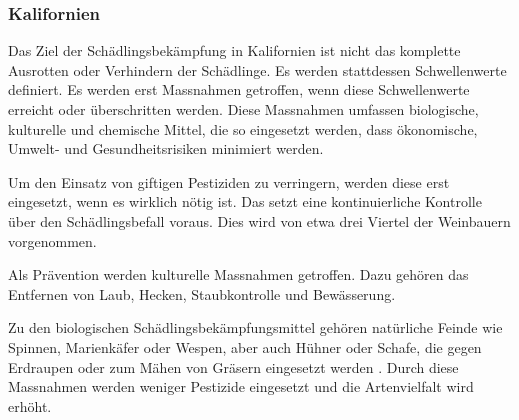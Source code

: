 \subsubsection{Kalifornien}
\label{sub:sch_dlingsbek_mpfung}

Das Ziel der Schädlingsbekämpfung in Kalifornien ist nicht das komplette Ausrotten oder Verhindern
der Schädlinge. Es werden stattdessen Schwellenwerte definiert. Es werden erst Massnahmen getroffen,
wenn diese Schwellenwerte erreicht oder überschritten werden. Diese Massnahmen umfassen biologische,
kulturelle und chemische Mittel, die so eingesetzt werden, dass ökonomische, Umwelt- und
Gesundheitsrisiken minimiert werden.

Um den Einsatz von giftigen Pestiziden zu verringern, werden diese erst eingesetzt, wenn es wirklich
nötig ist. Das setzt eine kontinuierliche Kontrolle über den Schädlingsbefall voraus. Dies wird von
etwa drei Viertel der Weinbauern vorgenommen.

Als Prävention werden kulturelle Massnahmen getroffen. Dazu gehören das Entfernen von Laub, Hecken,
Staubkontrolle und Bewässerung.

\cite{_2015_cswa_sustainability_report.pdf}
\cite{_2015_report_appendix.pdf}


Zu den biologischen Schädlingsbekämpfungsmittel gehören natürliche Feinde wie Spinnen, Marienkäfer
oder Wespen, aber auch Hühner oder Schafe, die gegen Erdraupen oder zum Mähen von Gräsern eingesetzt
werden \cite{_sustainable}.  Durch diese Massnahmen werden weniger
Pestizide eingesetzt und die Artenvielfalt wird erhöht.